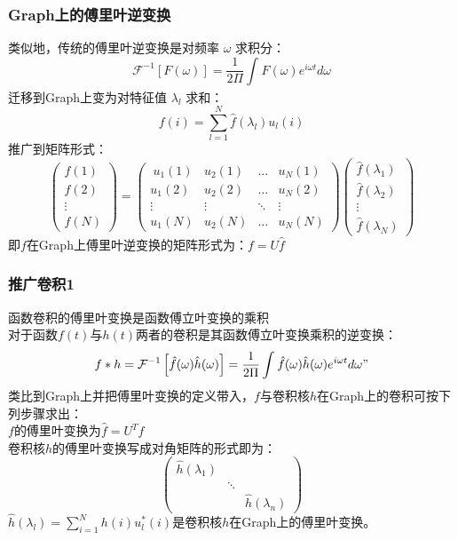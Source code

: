 \documentclass{beamer}
\begin{document}
\begin{frame}
    \frametitle{Graph上的傅里叶逆变换}
    类似地，传统的傅里叶逆变换是对频率 $\omega$ 求积分：
    $$\mathcal{F}^{-1}[F(\omega)]=\frac{1}{2\Pi}\int_{}^{}F(\omega)e^{i\omega t} d\omega$$
    迁移到Graph上变为对特征值 $\lambda_l$ 求和：
    $$f(i)=\sum_{l=1}^{N}{\hat{f}(\lambda_l) u_l(i)}$$
    推广到矩阵形式：
    $$ \left(\begin{matrix}f(1)\\ f(2) \\ \vdots \\f(N) \end{matrix}\right)= \left(\begin{matrix}\ u_1(1) &u_2(1)& \dots &u_N(1) \\u_1(2) &u_2(2)& \dots &u_N(2)\\ \vdots &\vdots &\ddots & \vdots\\ u_1(N) &u_2(N)& \dots &u_N(N) \end{matrix}\right) \left(\begin{matrix} \hat{f}(\lambda_1)\\ \hat{f}(\lambda_2) \\ \vdots \\\hat{f}(\lambda_N) \end{matrix}\right)$$
    即$f$在Graph上傅里叶逆变换的矩阵形式为：$f=U\hat{f}$
\end{frame}

\begin{frame}
    \frametitle{推广卷积1}
    函数卷积的傅里叶变换是函数傅立叶变换的乘积\\
    对于函数$f(t)$与$h(t)$两者的卷积是其函数傅立叶变换乘积的逆变换：\\
    $$f*h=\mathcal{F}^{-1}\left[ \hat{f}(\omega)\hat{h}(\omega) \right]=\frac{1}{2\Pi}\int_{}^{} \hat{f}(\omega)\hat{h}(\omega)e^{i\omega t} d\omega"$$
    类比到Graph上并把傅里叶变换的定义带入，$f$与卷积核$h$在Graph上的卷积可按下列步骤求出：\\
    $f$的傅里叶变换为$\hat{f}=U^Tf$\\
    卷积核$h$的傅里叶变换写成对角矩阵的形式即为：
    $$\left(\begin{matrix}\hat h(\lambda_1) & \\&\ddots \\ &&\hat h(\lambda_n) \end{matrix}\right)$$
    $\hat{h}(\lambda_l)=\sum_{i=1}^{N}{h(i) u_l^*(i)}$是卷积核$h$在Graph上的傅里叶变换。

\end{frame}
\end{document}
